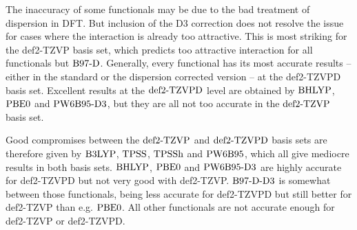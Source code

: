 \documentclass[8.5pt,twoside,twocolumn]{article}
\theoremstyle{standard}
\begin{document}
The inaccuracy of some functionals may be due to the bad treatment of
dispersion in DFT. But inclusion of the D3 correction does not resolve the issue for cases
where the interaction is already too attractive. This
is most striking for the def2-TZVP basis set, which predicts too attractive
interaction for all functionals but $\text{B97-D}$. Generally, every functional has its
most accurate results -- either in the standard or the dispersion corrected version --
at the def2-TZVPD basis set. Excellent
results at the $\text{def2-TZVPD}$ level are obtained by $\text{BHLYP}$, $\text{PBE0}$ and $\text{PW6B95}\text{-D3}$,
but they are all not too accurate in the $\text{def2-TZVP}$ basis set.  

Good compromises between the $\text{def2-TZVP}$ and $\text{def2-TZVPD}$ basis sets
are therefore given by $\text{B3LYP}$, $\text{TPSS}$, $\text{TPSSh}$ and $\text{PW6B95}$, which all give
mediocre results in both basis sets. $\text{BHLYP}$, $\text{PBE0}$ and $\text{PW6B95}\text{-D3}$ are highly
accurate for def2-TZVPD but not very good with def2-TZVP. $\text{B97-D}\text{-D3}$ is somewhat
between those functionals, being less accurate for def2-TZVPD but still better
for def2-TZVP than e.g. $\text{PBE0}$. All other functionals are not accurate enough
for def2-TZVP or def2-TZVPD.

\end{document}
